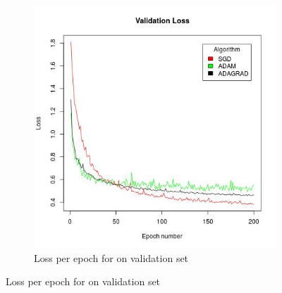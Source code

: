 \documentclass[12pt,twoside]{article}
\theoremstyle{plain}
\theoremstyle{definition}
\theoremstyle{remark}
\begin{document}
\begin{figure}[H]
\begin{subfigure}{.5\textwidth}
    \includegraphics[scale=.46]{Code/val_loss.jpg}
    \caption{Loss per epoch for on validation set}
    \label{fig:loss_val}
  \end{subfigure}%
\end{figure}
\end{document}

